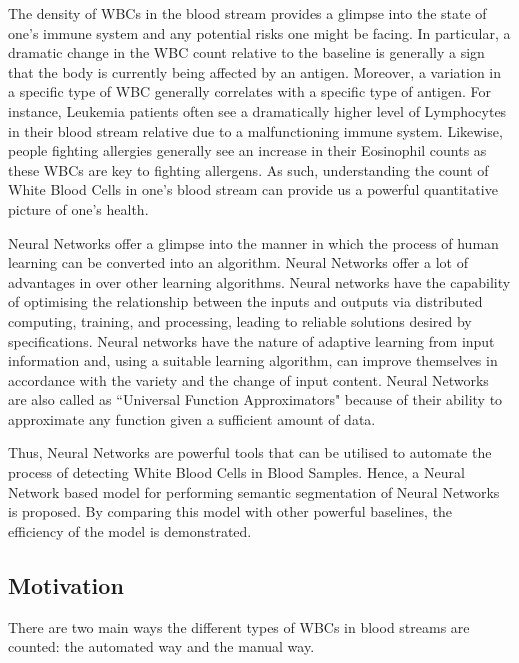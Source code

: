 \documentclass{nitk}
\begin{document}
    The density of WBCs in the blood stream provides a glimpse into the state of one's immune system and any potential risks one might be facing. In particular, a dramatic change in the WBC count relative to the baseline is generally a sign that the body is currently being affected by an antigen. Moreover, a variation in a specific type of WBC generally correlates with a specific type of antigen. For instance, Leukemia patients often see a dramatically higher level of Lymphocytes in their blood stream relative due to a malfunctioning immune system. Likewise, people fighting allergies generally see an increase in their Eosinophil counts as these WBCs are key to fighting allergens. As such, understanding the count of White Blood Cells in one's blood stream can provide us a powerful quantitative picture of one's health. \\ \par
    
    {Neural Networks offer a glimpse into the manner in which the process of human learning can be converted into an algorithm. Neural Networks offer a lot of advantages in over other learning algorithms. Neural networks have the capability of optimising the relationship between the inputs and outputs via distributed computing, training, and processing, leading to reliable solutions desired by specifications. Neural networks have the nature of adaptive learning from input information and, using a suitable learning algorithm, can improve themselves in accordance with the variety and the change of input content. Neural Networks are also called as ``Universal Function Approximators" because of their ability to approximate any function given a sufficient amount of data. \\}
    
    {Thus, Neural Networks are powerful tools that can be utilised to automate the process of detecting White Blood Cells in Blood Samples. Hence, a Neural Network based model for performing semantic segmentation of Neural Networks is proposed. By comparing this model with other powerful baselines, the efficiency of the model is demonstrated. \\}
    
    \subsection{Motivation}
    
    There are two main ways the different types of WBCs in blood streams are counted: the automated way and the manual way. \\ \par
    
\end{document}
